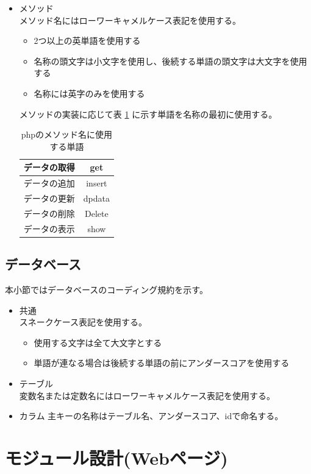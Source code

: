 \documentclass[a4j]{jarticle}
\begin{document}
\begin{itemize}
	\item メソッド\\
		メソッド名にはローワーキャメルケース表記を使用する。
	\begin{itemize}
		\item 2つ以上の英単語を使用する
		\item 名称の頭文字は小文字を使用し、後続する単語の頭文字は大文字を使用する
		\item 名称には英字のみを使用する
	\end{itemize}
		メソッドの実装に応じて表 \ref {tab:ophp} に示す単語を名称の最初に使用する。
				\begin{table}[H]
			\caption{phpのメソッド名に使用する単語}
			\label{tab:ophp}
			\begin{center}
			\begin{tabular}{|c|c|}
			\hline
			データの取得 & get\\\hline
			データの追加 & insert\\\hline
			データの更新  & dpdata\\\hline
			データの削除  & Delete\\\hline
			データの表示 &show\\\hline
			\end{tabular}
			\end{center}
			\end{table}
\end{itemize}
\subsection{データベース}
本小節ではデータベースのコーディング規約を示す。
	\begin{itemize}
	\item 共通\\
		スネークケース表記を使用する。
	\begin{itemize}
		\item 使用する文字は全て大文字とする
		\item 単語が連なる場合は後続する単語の前にアンダースコアを使用する
	\end{itemize}
	\item テーブル\\
		変数名または定数名にはローワーキャメルケース表記を使用する。
	\item カラム
		主キーの名称はテーブル名、アンダースコア、idで命名する。
\end{itemize}


\section{モジュール設計(Webページ)}
\end{document}
